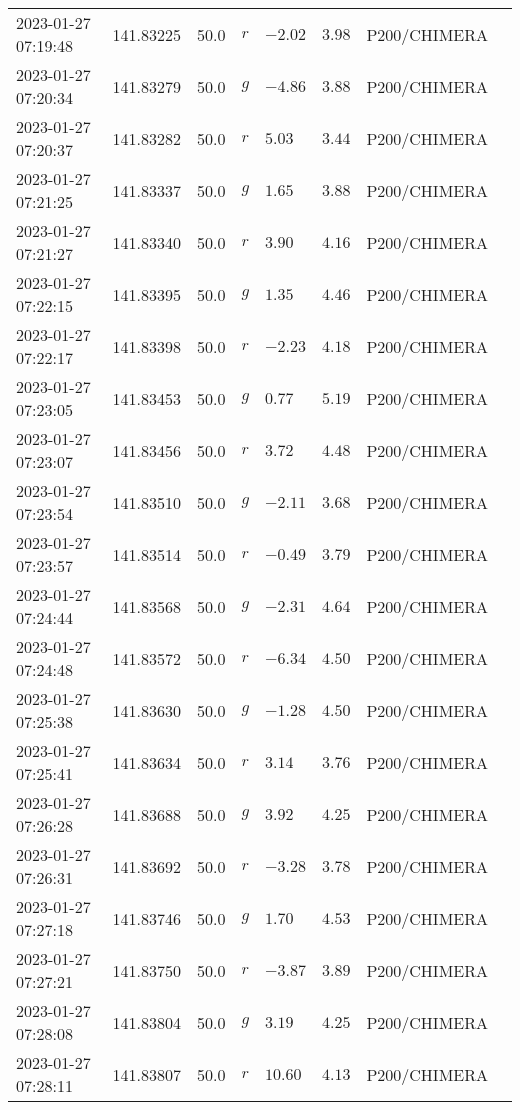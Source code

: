 \documentclass{nature_plusfigure}
\begin{document}
\begin{supplement}
\begin{center}
\begin{longtable}{llllllll}
2023-01-27 07:19:48 & 141.83225 & 50.0 & $r$ & $-2.02$ & $3.98$ & P200/CHIMERA &  \\ 
2023-01-27 07:20:34 & 141.83279 & 50.0 & $g$ & $-4.86$ & $3.88$ & P200/CHIMERA &  \\ 
2023-01-27 07:20:37 & 141.83282 & 50.0 & $r$ & $5.03$ & $3.44$ & P200/CHIMERA &  \\ 
2023-01-27 07:21:25 & 141.83337 & 50.0 & $g$ & $1.65$ & $3.88$ & P200/CHIMERA &  \\ 
2023-01-27 07:21:27 & 141.83340 & 50.0 & $r$ & $3.90$ & $4.16$ & P200/CHIMERA &  \\ 
2023-01-27 07:22:15 & 141.83395 & 50.0 & $g$ & $1.35$ & $4.46$ & P200/CHIMERA &  \\ 
2023-01-27 07:22:17 & 141.83398 & 50.0 & $r$ & $-2.23$ & $4.18$ & P200/CHIMERA &  \\ 
2023-01-27 07:23:05 & 141.83453 & 50.0 & $g$ & $0.77$ & $5.19$ & P200/CHIMERA &  \\ 
2023-01-27 07:23:07 & 141.83456 & 50.0 & $r$ & $3.72$ & $4.48$ & P200/CHIMERA &  \\ 
2023-01-27 07:23:54 & 141.83510 & 50.0 & $g$ & $-2.11$ & $3.68$ & P200/CHIMERA &  \\ 
2023-01-27 07:23:57 & 141.83514 & 50.0 & $r$ & $-0.49$ & $3.79$ & P200/CHIMERA &  \\ 
2023-01-27 07:24:44 & 141.83568 & 50.0 & $g$ & $-2.31$ & $4.64$ & P200/CHIMERA &  \\ 
2023-01-27 07:24:48 & 141.83572 & 50.0 & $r$ & $-6.34$ & $4.50$ & P200/CHIMERA &  \\ 
2023-01-27 07:25:38 & 141.83630 & 50.0 & $g$ & $-1.28$ & $4.50$ & P200/CHIMERA &  \\ 
2023-01-27 07:25:41 & 141.83634 & 50.0 & $r$ & $3.14$ & $3.76$ & P200/CHIMERA &  \\ 
2023-01-27 07:26:28 & 141.83688 & 50.0 & $g$ & $3.92$ & $4.25$ & P200/CHIMERA &  \\ 
2023-01-27 07:26:31 & 141.83692 & 50.0 & $r$ & $-3.28$ & $3.78$ & P200/CHIMERA &  \\ 
2023-01-27 07:27:18 & 141.83746 & 50.0 & $g$ & $1.70$ & $4.53$ & P200/CHIMERA &  \\ 
2023-01-27 07:27:21 & 141.83750 & 50.0 & $r$ & $-3.87$ & $3.89$ & P200/CHIMERA &  \\ 
2023-01-27 07:28:08 & 141.83804 & 50.0 & $g$ & $3.19$ & $4.25$ & P200/CHIMERA &  \\ 
2023-01-27 07:28:11 & 141.83807 & 50.0 & $r$ & $10.60$ & $4.13$ & P200/CHIMERA &  \\ 

\end{longtable}
\end{center}
\end{supplement}
\end{document}
